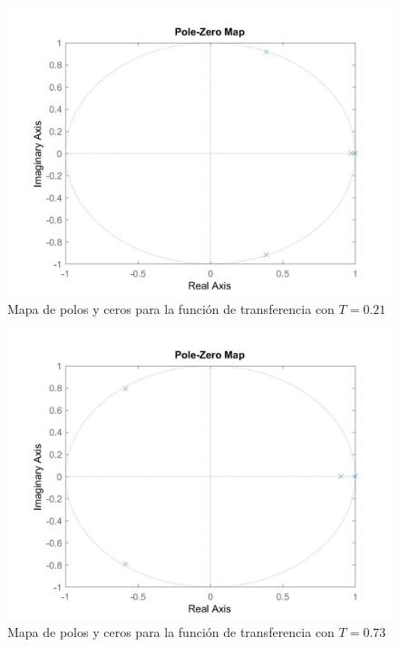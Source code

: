 \documentclass[journal]{IEEEtran}
\begin{document}
\begin{figure}[t]
\caption{Mapa de polos y ceros para la función de transferencia con $T=0.21$\label{fig:pzGd}}
  \centering
\includegraphics[scale=0.18]{tf/pzmap_Gd.jpg}
\end{figure}

\begin{figure}[t]
\caption{Mapa de polos y ceros para la función de transferencia con $T=0.73$\label{fig:pzGd1}}
  \centering
\includegraphics[scale=0.18]{tf/pzmap_Gd_1.jpg}
\end{figure}
\end{document}
